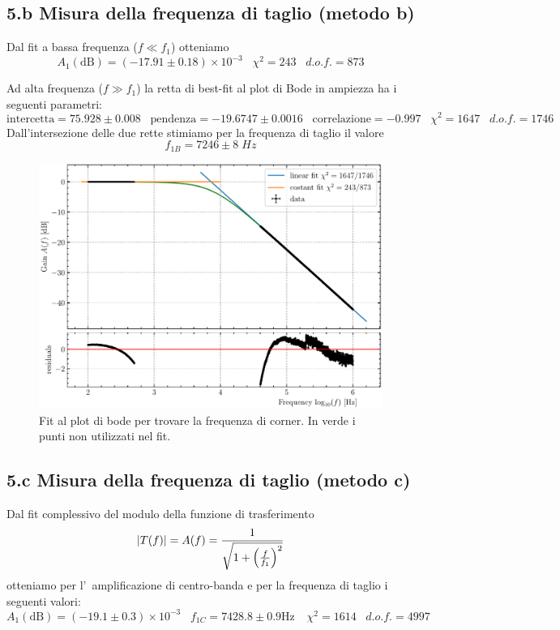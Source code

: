 \documentclass[10pt,a4paper]{article}
\begin{document}
\subsection*{5.b Misura della frequenza di taglio (metodo b)}
Dal fit a bassa frequenza ($f\ll f_1$) otteniamo
\[
A_1(\mathrm{dB}) = \left(-17.91 \pm 0.18\right)\times 10^{-3} \;\;\;
\chi^2 = 243 \;\;\; d.o.f. = 873
\]

Ad alta frequenza ($f \gg f_1$) la retta di best-fit al plot di Bode in 
ampiezza ha i seguenti parametri:
\[
\mathrm{intercetta} = 75.928 \pm 0.008 \;\;\;\mathrm{pendenza} = -19.6747 \pm 
0.0016 \;\;\;\mathrm{correlazione} 
= -0.997 \;\;\; \chi^2 = 1647 \;\;\; d.o.f. = 1746
\]
Dall'intersezione delle due rette stimiamo per la frequenza di taglio il valore
\[
f_{1B} = 7246 \pm 8 \; \si{Hz}
\]

\begin{figure}[htbp]
\centering
\includegraphics[scale=0.7]{corner}
\caption{Fit al plot di bode per trovare la frequenza di corner. In verde i
punti non utilizzati nel fit. \label{fig: corner}}
\end{figure}

\subsection*{5.c Misura della frequenza di taglio (metodo c)}
Dal fit complessivo del modulo della funzione di trasferimento
\begin{equation}\label{eq: lpfgain}
\left| T(f) \right| = A(f) = \frac{1}{\sqrt{1 + \left(\frac{f}{f_1}\right)^2}}
\end{equation}
otteniamo per l'~amplificazione di centro-banda e per la frequenza di taglio i 
seguenti valori:
\[
A_1 (\mathrm{dB}) = \left(-19.1 \pm 0.3\right)\times 10^{-3} \;\;\;
f_{1C} = 7428.8 \pm 0.9 \si{\Hz} \;\;\;\ \chi^2 = 1614 \;\;\; d.o.f.= 4997
\]
\end{document}

